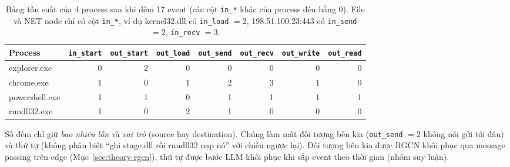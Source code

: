 \begin{table}[H]
\centering
\small
\begin{tabular}{l r r r r r r r}
\toprule
\textbf{Process} & \texttt{in\_start} & \texttt{out\_start} & \texttt{out\_load} & \texttt{out\_send} & \texttt{out\_recv} & \texttt{out\_write} & \texttt{out\_read} \\
\midrule
explorer.exe   & 0 & 2 & 0 & 0 & 0 & 0 & 0 \\
chrome.exe     & 1 & 0 & 1 & 2 & 3 & 1 & 0 \\
powershell.exe & 1 & 1 & 0 & 1 & 1 & 1 & 1 \\
rundll32.exe   & 1 & 0 & 2 & 1 & 0 & 0 & 0 \\
\bottomrule
\end{tabular}
\caption{Bảng tần suất của 4 process sau khi đếm 17 event (các cột \texttt{in\_*} khác của process đều bằng 0). File và NET node chỉ có cột \texttt{in\_*}, ví dụ kernel32.dll có \texttt{in\_load} $= 2$, 198.51.100.23:443 có \texttt{in\_send} $= 2$, \texttt{in\_recv} $= 3$.}
\label{tab:feat-counts}
\end{table}

Số đếm chỉ giữ \emph{bao nhiêu lần} và \emph{vai trò} (source hay destination). Chúng làm mất đối tượng bên kia (\texttt{out\_send} $= 2$ không nói gửi tới đâu) và thứ tự (không phân biệt ``ghi stage.dll rồi rundll32 nạp nó'' với chiều ngược lại). Đối tượng bên kia được RGCN khôi phục qua message passing trên edge (Mục~\ref{sec:theory-rgcn}), thứ tự được bước LLM khôi phục khi sắp event theo thời gian (nhóm suy luận).

